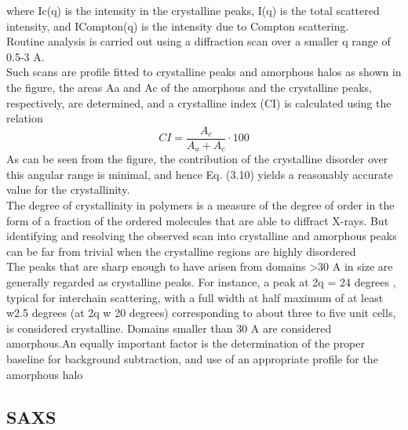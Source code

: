 where Ic(q) is the intensity in the crystalline peaks, I(q) is the total scattered
intensity, and ICompton(q) is the intensity due to Compton scattering.\\
Routine analysis is carried out using a diffraction
scan over a smaller q range of 0.5-3 A.\\
Such scans are profile fitted to crystalline peaks and amorphous halos
as shown in the figure, the areas Aa and Ac of the amorphous and the crystalline
peaks, respectively, are determined, and a crystalline index (CI) is calculated using
the relation
\[
CI = \frac{A_c}{A_a+A_c} \cdot 100
\]
As can be seen from the figure, the contribution of the crystalline disorder over this
angular range is minimal, and hence Eq. (3.10) yields a reasonably accurate value for
the crystallinity.\\
The degree of crystallinity in polymers is a measure of the degree of order in the
form of a fraction of the ordered molecules that are able to diffract X-rays. But
identifying and resolving the observed scan into crystalline and amorphous peaks
can be far from trivial when the crystalline regions are highly disordered\\
The peaks that are sharp enough to have arisen from domains >30 A
in size are
generally regarded as crystalline peaks. For instance, a peak at 2q = 24 degrees , typical for interchain scattering, with a full width at half maximum of at least w2.5 degrees (at 2q w 20 degrees) corresponding to about
three to five unit cells, is considered crystalline. Domains smaller than 30 A are considered amorphous.An equally important factor is the determination of the
proper baseline for background subtraction, and use of an appropriate profile for
the amorphous halo
\subsection{SAXS}



	